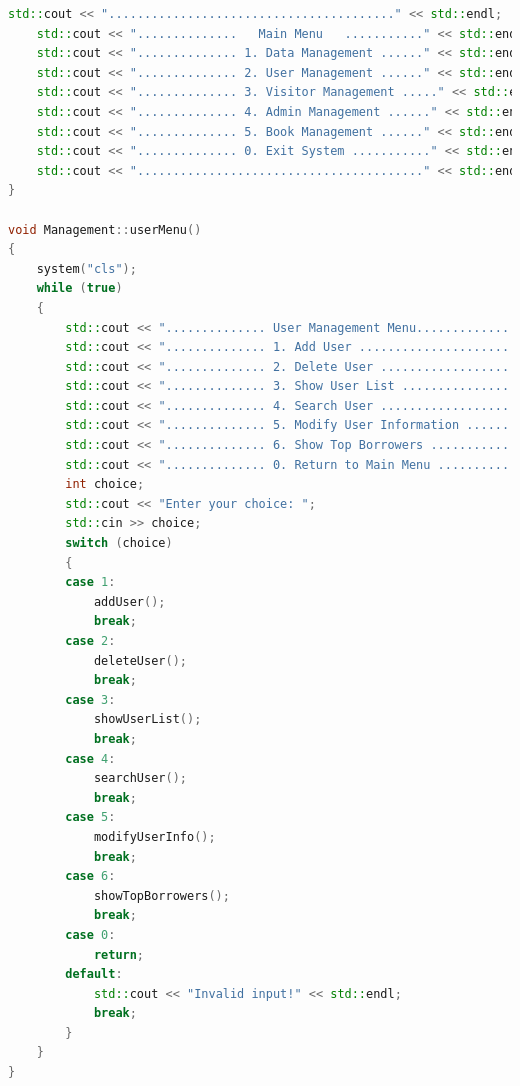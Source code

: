 \documentclass[12pt,twoside]{ctexart}
\begin{document}
\begin{lstlisting}[language=C++]
    std::cout << "........................................" << std::endl;
    std::cout << "..............   Main Menu   ..........." << std::endl;
    std::cout << ".............. 1. Data Management ......" << std::endl;
    std::cout << ".............. 2. User Management ......" << std::endl;
    std::cout << ".............. 3. Visitor Management ....." << std::endl;
    std::cout << ".............. 4. Admin Management ......" << std::endl;
    std::cout << ".............. 5. Book Management ......" << std::endl;
    std::cout << ".............. 0. Exit System ..........." << std::endl;
    std::cout << "........................................" << std::endl;
}

void Management::userMenu()
{
    system("cls");
    while (true)
    {
        std::cout << ".............. User Management Menu.............." << std::endl;
        std::cout << ".............. 1. Add User ......................." << std::endl;
        std::cout << ".............. 2. Delete User ...................." << std::endl;
        std::cout << ".............. 3. Show User List ................" << std::endl;
        std::cout << ".............. 4. Search User ..................." << std::endl;
        std::cout << ".............. 5. Modify User Information ........" << std::endl;
        std::cout << ".............. 6. Show Top Borrowers ............." << std::endl;
        std::cout << ".............. 0. Return to Main Menu ............" << std::endl;
        int choice;
        std::cout << "Enter your choice: ";
        std::cin >> choice;
        switch (choice)
        {
        case 1:
            addUser();
            break;
        case 2:
            deleteUser();
            break;
        case 3:
            showUserList();
            break;
        case 4:
            searchUser();
            break;
        case 5:
            modifyUserInfo();
            break;
        case 6:
            showTopBorrowers();
            break;
        case 0:
            return;
        default:
            std::cout << "Invalid input!" << std::endl;
            break;
        }
    }
}


\end{lstlisting}
\end{document}
